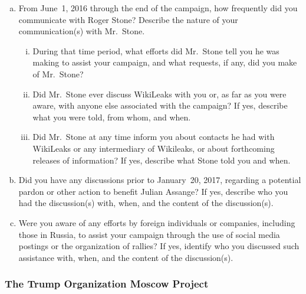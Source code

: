 \begin{enumerate}[a.]
\item From June~1, 2016 through the end of the campaign, how frequently did you communicate with Roger Stone? Describe the nature of your communication(s) with Mr.~Stone.

\begin{enumerate}[i.]

\item During that time period, what efforts did Mr.~Stone tell you he was making to assist your campaign, and what requests, if any, did you make of Mr.~Stone?

\item Did Mr.~Stone ever discuss WikiLeaks with you or, as far as you were aware, with anyone else associated with the campaign?
If yes, describe what you were told, from whom, and when.

\item Did Mr.~Stone at any time inform you about contacts he had with WikiLeaks or any intermediary of Wikileaks, or about forthcoming releases of information?
If yes, describe what Stone told you and when.

\end{enumerate}

\item Did you have any discussions prior to January~20, 2017, regarding a potential pardon or other action to benefit Julian Assange?
If yes, describe who you had the discussion(s) with, when, and the content of the discussion(s).

\item Were you aware of any efforts by foreign individuals or companies, including those in Russia, to assist your campaign through the use of social media postings or the organization of rallies?
If yes, identify who you discussed such assistance with, when, and the content of the discussion(s).

\end{enumerate}

\subsubsection{The Trump Organization Moscow Project}

